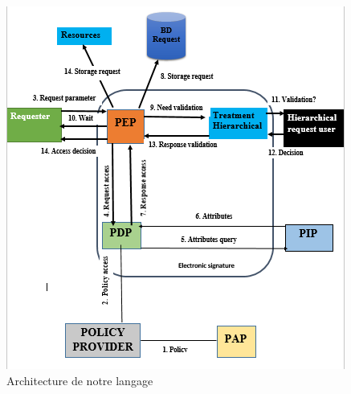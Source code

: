 \begin{figure}[h!]
    \centering
		\includegraphics[scale=1.0]{chap4/images/flux.png}
    \caption{Architecture de notre langage}
	 \label{figFluxD}
\end{figure} 

